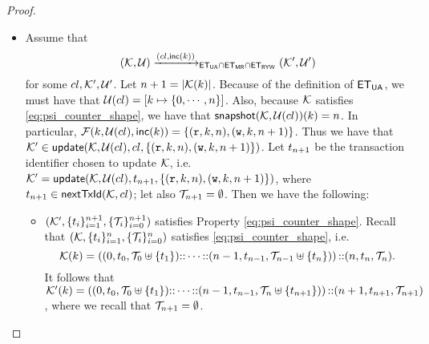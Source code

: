 \begin{proof}
\begin{itemize}
\item 
Assume that
\[
(\mathcal{K}, \mathcal{U}) \xrightarrow{({cl}, \mathsf{inc}(k))}_{\mathsf{ET}_{\mathsf{UA}} \cap \mathsf{ET}_{\mathsf{MR}} \cap  \mathsf{ET}_{\mathsf{RYW}}} (\mathcal{K}', \mathcal{U}')
\]
for some ${cl}, \mathcal{K}', \mathcal{U}'$. Let $n+1 = \lvert \mathcal{K}(k) \rvert$. Because of the definition of 
$\mathsf{ET}_{\mathsf{UA}}$, we must have that $\mathcal{U}({cl}) = [k \mapsto \{0, \cdots, n\}]$. Also, 
because $\mathcal{K}$ satisfies \eqref{eq:psi_counter_shape}, we have that $\mathsf{snapshot}(\mathcal{K}, \mathcal{U}({cl}))(k) = n$. 
In particular, $\mathcal{F}(k, \mathcal{U}({cl}), \mathsf{inc}(k)) = \{(\textnormal{\texttt r}, k, n), (\textnormal{\texttt w}, k, n+1)\}$. 
Thus we have that $\mathcal{K}' \in \mathsf{update}(\mathcal{K}, \mathcal{U}({cl}), {cl}, \{(\textnormal{\texttt r}, k, n), (\textnormal{\texttt w}, k, n+1)\})$. 
Let $t_{n+1}$ be the transaction identifier 
chosen to update $\mathcal{K}$, i.e. $\mathcal{K}' = \mathsf{update}(\mathcal{K}, \mathcal{U}({cl}), t_{n+1}, \{(\textnormal{\texttt r}, k, n), (\textnormal{\texttt w}, k, n+1)\})$, 
where $t_{n+1} \in \mathsf{nextTxId}(\mathcal{K}, {cl})$; 
let also $\mathcal{T}_{n+1} = \emptyset$. Then we have the following: 
\begin{itemize}
\item  $(\mathcal{K}', \{t_{i}\}_{i=1}^{n+1}, \{\mathcal{T}_{i}\}_{i=0}^{n+1})$ satisfies Property \eqref{eq:psi_counter_shape}. 
Recall that $(\mathcal{K}, \{t_{i}\}_{i=1}^{n}, \{\mathcal{T}_{i}\}_{i=0}^{n})$ satisfies \eqref{eq:psi_counter_shape}, 
i.e.
\[\mathcal{K}(k) = \left( (0, t_{0}, \mathcal{T}_{0} \uplus \{t_1\}) \mathbb{::} \cdots \mathbb{::} (n-1, t_{n-1}, \mathcal{T}_{n-1} \uplus \{t_{n}\}) \right) 
\mathbb{::} (n, t_{n}, \mathcal{T}_{n}).
\]
It follows that $\mathcal{K}'(k) = \left( (0, t_{0}, \mathcal{T}_{0} \uplus \{t_1\}) \mathbb{::} \cdots \mathbb{::} (n-1, t_{n-1}, \mathcal{T}_{n} \uplus \{t_{n+1}\}) \right) 
\mathbb{::} (n+1, t_{n+1}, \mathcal{T}_{n+1})$, 
where we recall that $\mathcal{T}_{n+1} = \emptyset$.


\end{itemize}
\end{itemize}
\end{proof}
